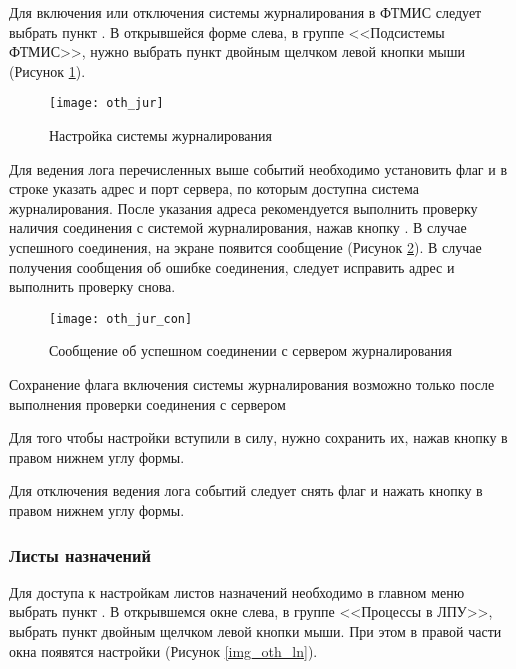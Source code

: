 Для включения или отключения системы журналирования в ФТМИС следует выбрать пункт . В открывшейся форме слева, в группе <<Подсистемы ФТМИС>>, нужно выбрать пункт  двойным щелчком левой кнопки мыши (Рисунок \ref{img_oth_jur}).

\begin{figure}[ht]\centering
 \texttt{[image: oth\_jur]}
 \caption{Настройка системы журналирования}
 \label{img_oth_jur}
\end{figure}

Для ведения лога перечисленных выше событий необходимо установить флаг  и в строке  указать адрес и порт сервера, по которым доступна система журналирования. После указания адреса рекомендуется выполнить проверку наличия соединения с системой журналирования, нажав кнопку  . В случае успешного соединения, на экране появится сообщение (Рисунок \ref{img_oth_jur_con}). В случае получения сообщения об ошибке соединения, следует исправить адрес и выполнить проверку снова.

\begin{figure}[ht]\centering
 \texttt{[image: oth\_jur\_con]}
 \caption{Сообщение об успешном соединении с сервером журналирования}
 \label{img_oth_jur_con}
\end{figure}

\begin{vnim}
Сохранение флага включения системы журналирования возможно только после выполнения проверки соединения с сервером
\end{vnim}

Для того чтобы настройки вступили в силу, нужно сохранить их, нажав кнопку   в правом нижнем углу формы.

Для отключения ведения лога событий следует снять флаг  и нажать кнопку  в правом нижнем углу формы.

\subsubsection{Листы назначений} 

Для доступа к настройкам листов назначений необходимо в главном меню выбрать пункт . В открывшемся окне слева, в группе <<Процессы в ЛПУ>>, выбрать пункт  двойным щелчком левой кнопки мыши. При этом в правой части окна появятся настройки (Рисунок \ref{img_oth_ln}).

